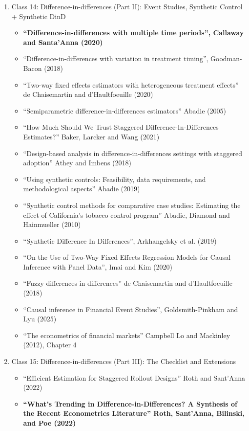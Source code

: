 \documentclass[11pt, a4paper]{article}
\begin{document}
\begin{enumerate}
\begin{enumerate}
  \item Class 14: Difference-in-differences (Part II): Event Studies, Synthetic Control + Synthetic DinD
    \begin{itemize}
    \item \textbf{``Difference-in-differences with multiple time periods'', Callaway and Santa'Anna (2020)}
    \item ``Difference-in-differences with variation in treatment timing'', Goodman-Bacon (2018)
    \item ``Two-way fixed effects estimators with heterogeneous treatment effects'' de Chaisemartin and d'Haultfoeuille (2020)
    \item ``Semiparametric difference-in-differences estimators'' Abadie (2005)
    \item ``How Much Should We Trust Staggered Difference-In-Differences Estimates?'' Baker, Larcker and Wang (2021)
    \item ``Design-based analysis in difference-in-differences settings with staggered adoption'' Athey and Imbens (2018)
    \item ``Using synthetic controls: Feasibility, data requirements, and methodological aspects'' Abadie (2019)
    \item ``Synthetic control methods for comparative case studies: Estimating the effect of California’s tobacco control program'' Abadie, Diamond and Hainmueller (2010)
    \item ``Synthetic Difference In Differences'', Arkhangelsky et al. (2019)
    \item ``On the Use of Two-Way Fixed Effects Regression Models for Causal Inference with Panel Data'', Imai and Kim (2020)
    \item ``Fuzzy differences-in-differences'' de Chaisemartin and d'Haultfoeuille (2018)
    \item ``Causal inference in Financial Event Studies'', Goldsmith-Pinkham and Lyu (2025)
    \item ``The econometrics of financial markets'' Campbell Lo and Mackinley (2012), Chapter 4
    \end{itemize}
  \item Class 15: Difference-in-differences (Part III): The Checklist and Extensions
    \begin{itemize}
    \item ``Efficient Estimation for Staggered Rollout Designs'' Roth and Sant'Anna (2022)
    \item \textbf{``What’s Trending in Difference-in-Differences? A Synthesis of the Recent Econometrics Literature'' Roth, Sant’Anna,  Bilinski, and Poe (2022)}

\end{itemize}
\end{enumerate}
\end{enumerate}
\end{document}
